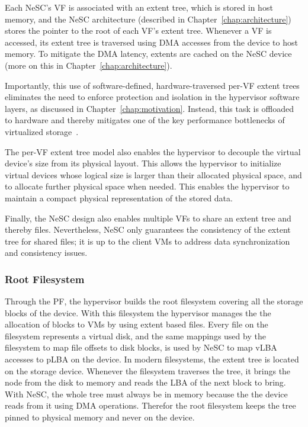 Each  NeSC's VF is associated with an extent tree, which is stored in host memory, and the NeSC architecture (described in Chapter~\ref{chap:architecture}) stores the pointer to the root of each VF's extent tree. Whenever a VF is accessed, its extent tree is traversed using DMA accesses from the device to host memory. To mitigate the DMA latency, extents are cached on the NeSC device (more on this in Chapter~\ref{chap:architecture}).

Importantly, this use of software-defined, hardware-traversed per-VF extent trees eliminates the need to enforce protection and isolation in the hypervisor software layers, as discussed in Chapter~\ref{chap:motivation}. Instead, this task is offloaded to hardware and thereby mitigates one of the key performance bottlenecks of virtualized storage~\cite{le12nested}.

The per-VF extent tree model also enables the hypervisor to decouple the virtual device's size from its physical layout. This allows the hypervisor to initialize virtual devices whose logical size is larger than their allocated physical space, and to allocate further physical space when needed. This enables the hypervisor to maintain a compact physical representation of the stored data.

Finally, the NeSC design also enables multiple VFs to share an extent tree and thereby files. Nevertheless, NeSC only guarantees the consistency of the extent tree for shared files; it is up to the client VMs to address data synchronization and consistency issues.

\subsubsection{Root Filesystem}
\label{des:rootfs}
Through the PF, the hypervisor builds the root filesystem covering all the storage blocks of the device. With this filesystem the hypervisor manages the the allocation of blocks to VMs by using extent based files.
Every file on the filesystem represents a virtual disk, and the same mappings used by the filesystem to map file offsets to disk blocks, is used by NeSC to map vLBA accesses to pLBA on the device.
In modern filesystems, the extent tree is located on the storage device. Whenever the filesystem traverses the tree, it brings the node from the disk to memory and reads the LBA of the next block to bring. With NeSC,
the whole tree must always be in memory because the the device reads from it using DMA operations. Therefor the root filesystem keeps the tree pinned to physical memory and never on the device. 



